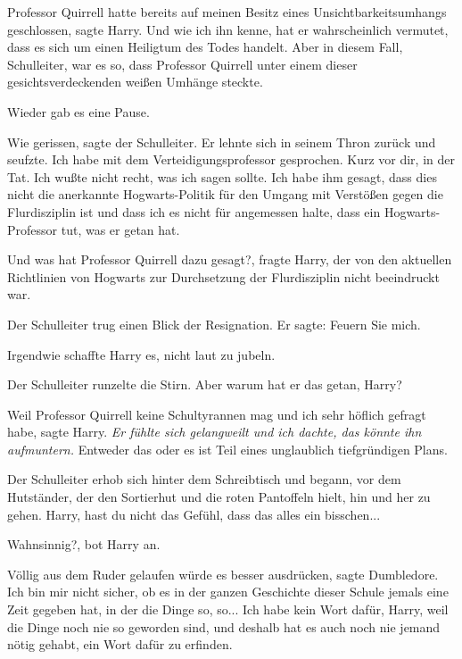 \glqq{}Professor Quirrell hatte bereits auf meinen Besitz eines
Unsichtbarkeitsumhangs geschlossen\grqq{}, sagte Harry. \glqq{}Und wie ich ihn
kenne, hat er wahrscheinlich vermutet, dass es sich um einen Heiligtum des Todes
handelt. Aber in diesem Fall, Schulleiter, war es so, dass Professor Quirrell
unter einem dieser gesichtsverdeckenden weißen Umhänge steckte.\grqq{}

Wieder gab es eine Pause.

\glqq{}Wie gerissen\grqq{}, sagte der Schulleiter. Er lehnte sich in seinem Thron
zurück und seufzte. \glqq{}Ich habe mit dem Verteidigungsprofessor gesprochen.
Kurz vor dir, in der Tat. Ich wußte nicht recht, was ich sagen sollte. Ich habe
ihm gesagt, dass dies nicht die anerkannte Hogwarts-Politik für den Umgang mit
Verstößen gegen die Flurdisziplin ist und dass ich es nicht für angemessen
halte, dass ein Hogwarts-Professor tut, was er getan hat.\grqq{}

\glqq{}Und was hat Professor Quirrell dazu gesagt?\grqq{}, fragte Harry, der von
den aktuellen Richtlinien von Hogwarts zur Durchsetzung der Flurdisziplin nicht
beeindruckt war.

Der Schulleiter trug einen Blick der Resignation. \glqq{}Er sagte: Feuern Sie
mich.\grqq{}

Irgendwie schaffte Harry es, nicht laut zu jubeln.

Der Schulleiter runzelte die Stirn. \glqq{}Aber warum hat er das getan,
Harry?\grqq{}

\glqq{}Weil Professor Quirrell keine Schultyrannen mag und ich sehr höflich
gefragt habe\grqq{}, sagte Harry. \emph{Er fühlte sich gelangweilt und ich
dachte, das könnte ihn aufmuntern.} \glqq{}Entweder das oder es ist Teil eines
unglaublich tiefgründigen Plans.\grqq{}

Der Schulleiter erhob sich hinter dem Schreibtisch und begann, vor dem
Hutständer, der den Sortierhut und die roten Pantoffeln hielt, hin und her zu
gehen. \glqq{}Harry, hast du nicht das Gefühl, dass das alles ein
bisschen...\grqq{}

\glqq{}Wahnsinnig?\grqq{}, bot Harry an.

\glqq{}Völlig aus dem Ruder gelaufen würde es besser ausdrücken\grqq{}, sagte
Dumbledore. \glqq{}Ich bin mir nicht sicher, ob es in der ganzen Geschichte
dieser Schule jemals eine Zeit gegeben hat, in der die Dinge so, so... Ich habe
kein Wort dafür, Harry, weil die Dinge noch nie so geworden sind, und deshalb
hat es auch noch nie jemand nötig gehabt, ein Wort dafür zu erfinden.\grqq{}

